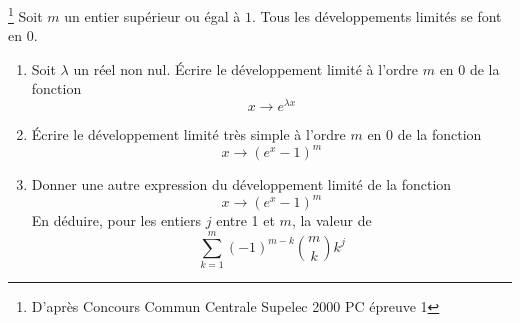 \footnote{D'après Concours Commun Centrale Supelec 2000 PC épreuve 1}
Soit $m$ un entier supérieur ou égal à $1$. Tous les développements limités se font en $0$.
\begin{enumerate}
  \item Soit $\lambda$ un réel non nul. {\'E}crire le développement limité à l'ordre $m$ en 0 de la fonction
\begin{displaymath}
 x \rightarrow e^{\lambda x}
\end{displaymath}

  \item {\'E}crire le développement limité très simple à l'ordre $m$ en 0 de la fonction
\begin{displaymath}
x \rightarrow (e^ x -1 )^m 
\end{displaymath}

  \item Donner une autre expression du développement limité de la fonction
\begin{displaymath}
 x \rightarrow (e^ x -1 )^m
\end{displaymath}
En déduire, pour les entiers $j$ entre 1 et $m$, la valeur de
\begin{displaymath}
 \sum_{k=1}^m (-1)^{m-k}\binom{m}{k} k^j
\end{displaymath}
\end{enumerate}
